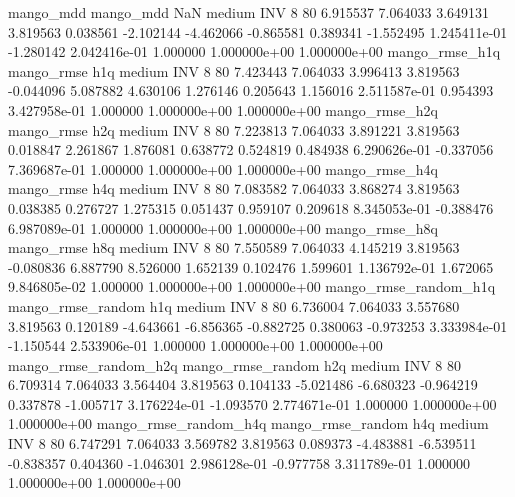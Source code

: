             mango_mdd         mango_mdd                  NaN     medium      INV                 8 80  6.915537       7.064033 3.649131       3.819563    0.038561     -2.102144     -4.462066    -0.865581       0.389341 -1.552495 1.245411e-01    -1.280142   2.042416e-01            1.000000    1.000000e+00        1.000000e+00
       mango_rmse_h1q        mango_rmse                  h1q     medium      INV                 8 80  7.423443       7.064033 3.996413       3.819563   -0.044096      5.087882      4.630106     1.276146       0.205643  1.156016 2.511587e-01     0.954393   3.427958e-01            1.000000    1.000000e+00        1.000000e+00
       mango_rmse_h2q        mango_rmse                  h2q     medium      INV                 8 80  7.223813       7.064033 3.891221       3.819563    0.018847      2.261867      1.876081     0.638772       0.524819  0.484938 6.290626e-01    -0.337056   7.369687e-01            1.000000    1.000000e+00        1.000000e+00
       mango_rmse_h4q        mango_rmse                  h4q     medium      INV                 8 80  7.083582       7.064033 3.868274       3.819563    0.038385      0.276727      1.275315     0.051437       0.959107  0.209618 8.345053e-01    -0.388476   6.987089e-01            1.000000    1.000000e+00        1.000000e+00
       mango_rmse_h8q        mango_rmse                  h8q     medium      INV                 8 80  7.550589       7.064033 4.145219       3.819563   -0.080836      6.887790      8.526000     1.652139       0.102476  1.599601 1.136792e-01     1.672065   9.846805e-02            1.000000    1.000000e+00        1.000000e+00
mango_rmse_random_h1q mango_rmse_random                  h1q     medium      INV                 8 80  6.736004       7.064033 3.557680       3.819563    0.120189     -4.643661     -6.856365    -0.882725       0.380063 -0.973253 3.333984e-01    -1.150544   2.533906e-01            1.000000    1.000000e+00        1.000000e+00
mango_rmse_random_h2q mango_rmse_random                  h2q     medium      INV                 8 80  6.709314       7.064033 3.564404       3.819563    0.104133     -5.021486     -6.680323    -0.964219       0.337878 -1.005717 3.176224e-01    -1.093570   2.774671e-01            1.000000    1.000000e+00        1.000000e+00
mango_rmse_random_h4q mango_rmse_random                  h4q     medium      INV                 8 80  6.747291       7.064033 3.569782       3.819563    0.089373     -4.483881     -6.539511    -0.838357       0.404360 -1.046301 2.986128e-01    -0.977758   3.311789e-01            1.000000    1.000000e+00        1.000000e+00
